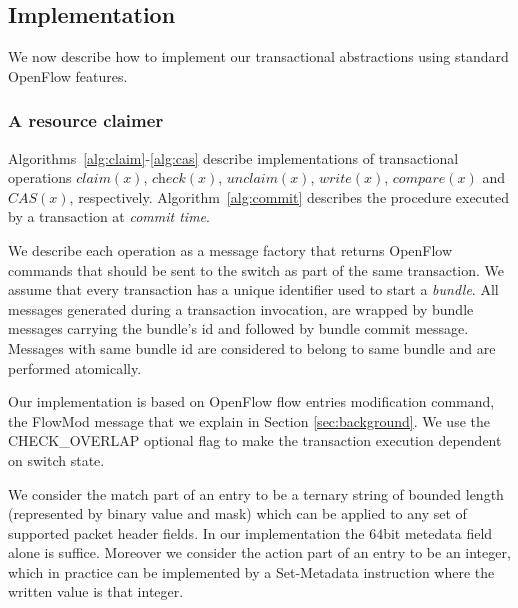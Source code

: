 \documentclass[conference]{sigcomm-alternate}
\newcommand{\cas}{CAS\xspace}
\newcommand{\claimcheck}{check\xspace}
\newcommand{\compare}{compare\xspace}
\begin{document}
\subsection{Implementation}\label{sec:t-impl}

We now describe how to implement our transactional
abstractions using standard OpenFlow features.


\subsubsection{A resource claimer}
Algorithms~\ref{alg:claim}-\ref{alg:cas} describe implementations of
transactional operations  $\textit{claim}(x)$, $\textit{\claimcheck}(x)$, $\textit{unclaim}(x)$, $\textit{write}(x)$,  $\textit{\compare}(x)$
and $\textit{\cas}(x)$, respectively.
Algorithm~\ref{alg:commit} describes the procedure executed by
a transaction at \emph{commit time}.

We describe each operation as a message factory that returns OpenFlow commands that should be sent to the switch as part of the same transaction.
We assume that every transaction has a unique identifier  used to start a \emph{bundle}.
All messages generated during a transaction invocation, are wrapped by bundle messages carrying the bundle's id and followed by bundle commit message.
Messages with same bundle id are considered to belong to same bundle and are performed atomically.



Our implementation is based on OpenFlow flow entries modification command, the FlowMod message that we explain in Section \ref{sec:background}. We use the CHECK\_OVERLAP optional flag to make the transaction execution dependent on switch state.

We consider the match part of an entry to be a ternary string of bounded length (represented by binary value and mask) which can be applied to any set of supported packet header fields. In our implementation the $64$bit metedata field alone is suffice. Moreover we consider the action part of an entry to be an integer, which in practice can be implemented by a Set-Metadata instruction where the written value is that integer.
\end{document}
